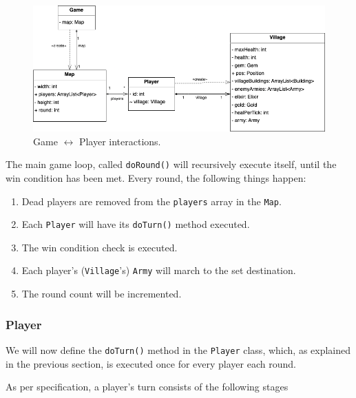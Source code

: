 \documentclass{article}
\newcommand{\code}[1]{\texttt{#1}}
\begin{document}
\begin{figure}[h]
	\vspace{1em}
	\centering
	\includegraphics[width=1\textwidth]{images/player-game.png}
	\caption{Game $\leftrightarrow$ Player interactions.}
\end{figure}

The main game loop, called \code{doRound()} will recursively execute itself,
until the win condition has been met. Every round, the following things happen:

\newpage

\begin{enumerate}
	\item Dead players are removed from the \code{players} array in the \code{Map}.
	\item Each \code{Player} will have its \code{doTurn()} method executed.
	\item The win condition check is executed.
	\item Each player's (\code{Village}'s) \code{Army} will march to the set destination.
	\item The round count will be incremented.
\end{enumerate}

\subsubsection*{Player}

We will now define the \code{doTurn()} method in the \code{Player} class, which,
as explained in the previous section, is executed once for every player each
round. 

As per specification, a player's turn consists of the following stages
\end{document}

